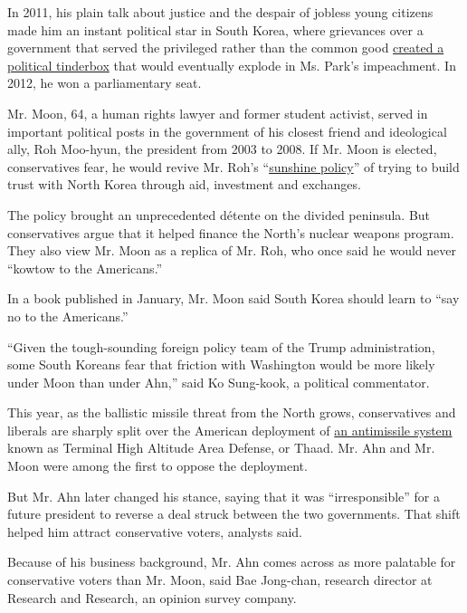 In 2011, his plain talk about justice and the despair of jobless young
citizens made him an instant political star in South Korea, where
grievances over a government that served the privileged rather than the
common good
\href{http://www.nytimes3xbfgragh.onion/2011/11/20/world/asia/a-new-voice-grips-south-korea-with-plain-talk-about-inequality-and-justice.html}{created
a political tinderbox} that would eventually explode in Ms. Park's
impeachment. In 2012, he won a parliamentary seat.

Mr. Moon, 64, a human rights lawyer and former student activist, served
in important political posts in the government of his closest friend and
ideological ally, Roh Moo-hyun, the president from 2003 to 2008. If Mr.
Moon is elected, conservatives fear, he would revive Mr. Roh's
``\href{http://www.nytimes3xbfgragh.onion/2008/01/17/world/asia/17korea.html}{sunshine
policy}'' of trying to build trust with North Korea through aid,
investment and exchanges.

The policy brought an unprecedented détente on the divided peninsula.
But conservatives argue that it helped finance the North's nuclear
weapons program. They also view Mr. Moon as a replica of Mr. Roh, who
once said he would never ``kowtow to the Americans.''

In a book published in January, Mr. Moon said South Korea should learn
to ``say no to the Americans.''

``Given the tough-sounding foreign policy team of the Trump
administration, some South Koreans fear that friction with Washington
would be more likely under Moon than under Ahn,'' said Ko Sung-kook, a
political commentator.

This year, as the ballistic missile threat from the North grows,
conservatives and liberals are sharply split over the American
deployment of
\href{https://www.nytimes3xbfgragh.onion/2017/03/06/world/asia/north-korea-thaad-missile-defense-us-china.html}{an
antimissile system} known as Terminal High Altitude Area Defense, or
Thaad. Mr. Ahn and Mr. Moon were among the first to oppose the
deployment.

But Mr. Ahn later changed his stance, saying that it was
``irresponsible'' for a future president to reverse a deal struck
between the two governments. That shift helped him attract conservative
voters, analysts said.

Because of his business background, Mr. Ahn comes across as more
palatable for conservative voters than Mr. Moon, said Bae Jong-chan,
research director at Research and Research, an opinion survey company.

